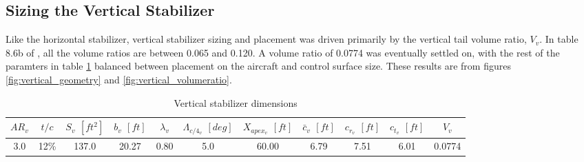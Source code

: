 \documentclass[conf]{new-aiaa}
\begin{document}
\subsection{Sizing the Vertical Stabilizer}

Like the horizontal stabilizer, vertical stabilizer sizing and placement was driven primarily by the vertical tail volume ratio, $V_v$. In table 8.6b of \cite{orange_book}, all the volume ratios are between 0.065 and 0.120. A volume ratio of 0.0774 was eventually settled on, with the rest of the paramters in table \ref{tab:vertical_stabilizer_size} balanced between placement on the aircraft and control surface size. These results are from figures \ref{fig:vertical_geometry} and \ref{fig:vertical_volumeratio}.

\begin{table}[H]
\centering
\caption{Vertical stabilizer dimensions}
\begin{tabular}{|c|c|c|c|c|c|c|c|c|c|c|}\hline
    $AR_v$ & $t/c$ & $S_v$ $[ft^2]$ & $b_v$ $[ft]$ & $\lambda_v$ & $\Lambda_{c/4_v}$ $[deg]$ & $X_{apex_v}$ $[ft]$ & $\bar{c}_v$ $[ft]$ & $c_{r_v}$ $[ft]$ & $c_{t_v}$ $[ft]$ & $V_v$ \\ \hline
    3.0 & 12\% & 137.0 & 20.27 & 0.80 & 5.0  & 60.00 & 6.79 & 7.51 & 6.01 & 0.0774 \\ \hline
\end{tabular}
\label{tab:vertical_stabilizer_size}
\end{table}
\end{document}
